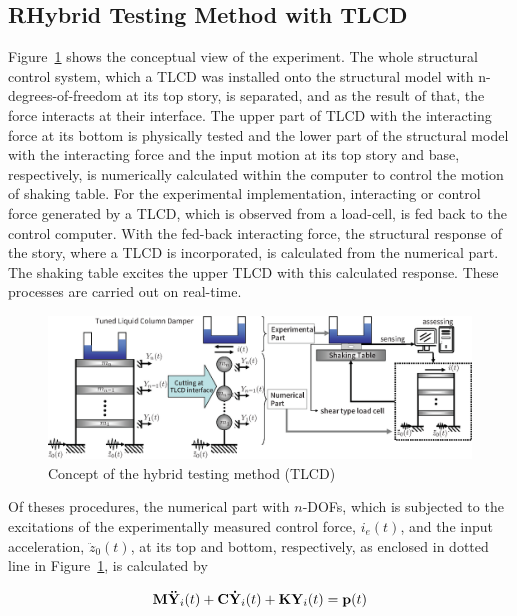 \subsection{RHybrid Testing Method with TLCD}
Figure~\ref{fig:4-1} shows the conceptual view of the experiment. The whole structural control system, which a TLCD was installed onto the structural model with n-degrees-of-freedom at its top story, is separated, and as the result of that, the force interacts at their interface. The upper part of TLCD with the interacting force at its bottom is physically tested and the lower part of the structural model with the interacting force and the input motion at its top story and base, respectively, is numerically calculated within the computer to control the motion of shaking table. For the experimental implementation, interacting or control force generated by a TLCD, which is observed from a load-cell, is fed back to the control computer. With the fed-back interacting force, the structural response of the story, where a TLCD is incorporated, is calculated from the numerical part. The shaking table excites the upper TLCD with this calculated response. These processes are carried out on real-time.

\begin{figure}[ht]
\centering
\includegraphics[width=1\textwidth] {figure/4-1.eps}
\caption{Concept of the hybrid testing method (TLCD)}
\label{fig:4-1}
\end{figure}

Of theses procedures, the numerical part with $n$-DOFs, which is subjected to the excitations of the experimentally measured control force, $i_{e}(t)$, and the input acceleration, $\ddot{z}_{0}(t)$, at its top and bottom, respectively, as enclosed in dotted line in Figure~\ref{fig:4-1}, is calculated by

\begin{equation}\label{eq:4-1}
\mathbf{M}\mathbf{\ddot{Y}}_{i}(t)+\mathbf{C}\mathbf{\dot{Y}}_{i}(t)+\mathbf{K}\mathbf{Y}_{i}(t)=\mathbf{p}(t)
\end{equation}

